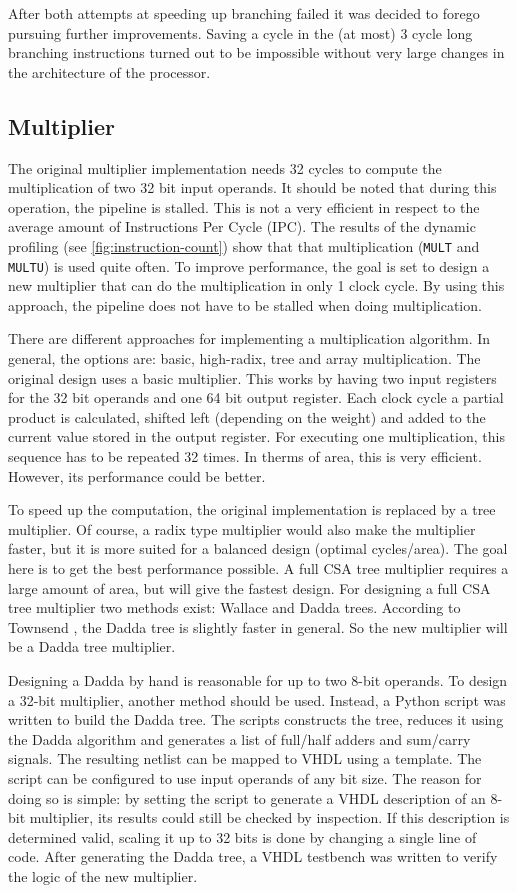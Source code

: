\documentclass[final]{article}
\begin{document}
After both attempts at speeding up branching failed it was decided to forego pursuing further improvements. Saving a cycle in the (at most) 3 cycle long branching instructions turned out to be impossible without very large changes in the architecture of the processor.

\subsection{Multiplier}
The original multiplier implementation needs 32 cycles to compute the multiplication of two 32 bit input operands. It should be noted that during this operation, the pipeline is stalled. This is not a very efficient in respect to the average amount of Instructions Per Cycle (IPC). The results of the dynamic profiling (see \cref{fig:instruction-count}) show that that multiplication (\texttt{MULT} and \texttt{MULTU}) is used quite often. To improve performance, the goal is set to design a new multiplier that can do the multiplication in only 1 clock cycle. By using this approach, the pipeline does not have to be stalled when doing multiplication.

There are different approaches for implementing a multiplication algorithm. In general, the options are: basic, high-radix, tree and array multiplication. The original design uses a basic multiplier. This works by having two input registers for the 32 bit operands and one 64 bit output register. Each clock cycle a partial product is calculated, shifted left (depending on the weight) and added to the current value stored in the output register. For executing one multiplication, this sequence has to be repeated 32 times. In therms of area, this is very efficient. However, its performance could be better.

To speed up the computation, the original implementation is replaced by a tree multiplier. Of course, a radix type multiplier would also make the multiplier faster, but it is more suited for a balanced design (optimal cycles/area). The goal here is to get the best performance possible. A full CSA tree multiplier requires a large amount of area, but will give the fastest design. For designing a full CSA tree multiplier two methods exist: Wallace and Dadda trees. According to Townsend \cite{townsend}, the Dadda tree is slightly faster in general. So the new multiplier will be a Dadda tree multiplier.

Designing a Dadda by hand is reasonable for up to two 8-bit operands. To design a 32-bit multiplier, another method should be used. Instead, a Python script was written to build the Dadda tree. The scripts constructs the tree, reduces it using the Dadda algorithm and generates a list of full/half adders and sum/carry signals. The resulting netlist can be mapped to VHDL using a template. The script can be configured to use input operands of any bit size. The reason for doing so is simple: by setting the script to generate a VHDL description of an 8-bit multiplier, its results could still be checked by inspection. If this description is determined valid, scaling it up to 32 bits is done by changing a single line of code. After generating the Dadda tree, a VHDL testbench was written to verify the logic of the new multiplier.
\end{document}
